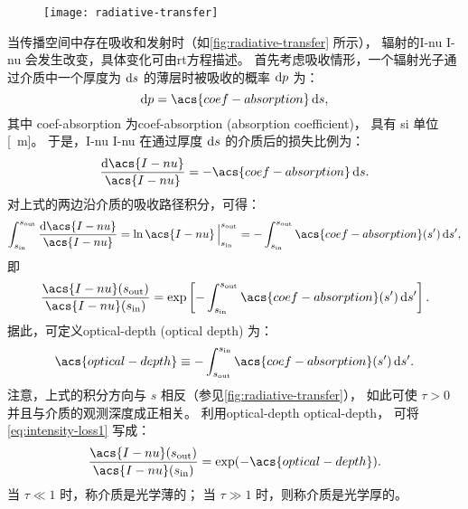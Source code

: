 \begin{figure}[htp]
  \centering
  \texttt{[image: radiative-transfer]}
  \label{fig:radiative-transfer}
\end{figure}

当传播空间中存在吸收和发射时（如\autoref{fig:radiative-transfer} 所示），
辐射的\acl{I-nu} \acs{I-nu} 会发生改变，具体变化可由\acf{rt}方程描述。
首先考虑吸收情形，一个辐射光子通过介质中一个厚度为 $\mathrm{d}s$ 的薄层时被吸收的概率 $\mathrm{d}p$ 为：
\begin{equation}
  \D{p} = \acs{coef-absorption} \,\D{s} ,
\end{equation}
其中 \acs{coef-absorption}
为\acl{coef-absorption} (absorption coefficient)，
具有 \ac{si} 单位 [\si{\per\meter}]。
于是，\acl{I-nu} \acs{I-nu} 在通过厚度 $\mathrm{d}s$ 的介质后的损失比例为：
\begin{equation}
  \label{eq:rt-absorption}
  \frac{\D{\acs{I-nu}}}{\acs{I-nu}} = - \acs{coef-absorption} \,\D{s} .
\end{equation}
对上式的两边沿介质的吸收路径积分，可得：
\begin{equation}
  \int_{s_{\R{in}}}^{s_{\R{out}}} \frac{\D{\acs{I-nu}}}{\acs{I-nu}}
    = \ln\acs{I-nu} \,\Big|_{s_{\R{in}}}^{s_{\R{out}}}
    = - \int_{s_{\R{in}}}^{s_{\R{out}}} \acs{coef-absorption}(s') \,\D{s'} ,
\end{equation}
即
\begin{equation}
  \label{eq:intensity-loss1}
  \frac{\acs{I-nu}(s_{\R{out}})}{\acs{I-nu}(s_{\R{in}})} =
    \exp \left[ - \int_{s_{\R{in}}}^{s_{\R{out}}}
      \acs{coef-absorption}(s') \,\D{s'} \right] .
\end{equation}
据此，可定义\acl{optical-depth} (optical depth) 为：
\begin{equation}
  \label{eq:optical-depth}
  \acs{optical-depth} \equiv
    - \int_{s_{\R{out}}}^{s_{\R{in}}} \acs{coef-absorption}(s') \,\D{s'} .
\end{equation}
注意，上式的积分方向与 $s$ 相反（参见\autoref{fig:radiative-transfer}），
如此可使 $\tau > 0$ 并且与介质的观测深度成正相关。
利用\acl{optical-depth} \acs{optical-depth}，
可将\autoref{eq:intensity-loss1} 写成：
\begin{equation}
  \label{eq:intensity-loss}
  \frac{\acs{I-nu}(s_{\R{out}})}{\acs{I-nu}(s_{\R{in}})} =
    \exp (-\acs{optical-depth}) .
\end{equation}
当 $\tau \ll 1$ 时，称介质是光学薄的；
当 $\tau \gg 1$ 时，则称介质是光学厚的。

